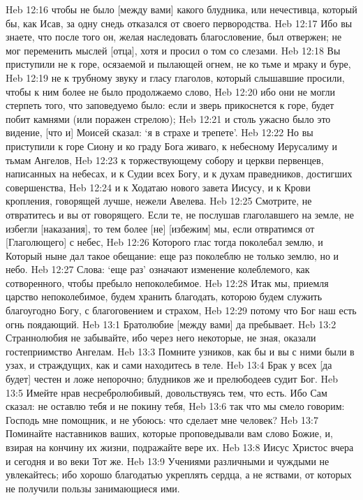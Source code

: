 Heb 12:16  чтобы не было [между вами] какого блудника, или нечестивца, который бы, как Исав, за одну снедь отказался от своего первородства.
Heb 12:17  Ибо вы знаете, что после того он, желая наследовать благословение, был отвержен; не мог переменить мыслей [отца], хотя и просил о том со слезами.
Heb 12:18  Вы приступили не к горе, осязаемой и пылающей огнем, не ко тьме и мраку и буре,
Heb 12:19  не к трубному звуку и гласу глаголов, который слышавшие просили, чтобы к ним более не было продолжаемо слово,
Heb 12:20  ибо они не могли стерпеть того, что заповедуемо было: если и зверь прикоснется к горе, будет побит камнями (или поражен стрелою);
Heb 12:21  и столь ужасно было это видение, [что и] Моисей сказал: `я в страхе и трепете'.
Heb 12:22  Но вы приступили к горе Сиону и ко граду Бога живаго, к небесному Иерусалиму и тьмам Ангелов,
Heb 12:23  к торжествующему собору и церкви первенцев, написанных на небесах, и к Судии всех Богу, и к духам праведников, достигших совершенства,
Heb 12:24  и к Ходатаю нового завета Иисусу, и к Крови кропления, говорящей лучше, нежели Авелева.
Heb 12:25  Смотрите, не отвратитесь и вы от говорящего. Если те, не послушав глаголавшего на земле, не избегли [наказания], то тем более [не] [избежим] мы, если отвратимся от [Глаголющего] с небес,
Heb 12:26  Которого глас тогда поколебал землю, и Который ныне дал такое обещание: еще раз поколеблю не только землю, но и небо.
Heb 12:27  Слова: `еще раз' означают изменение колеблемого, как сотворенного, чтобы пребыло непоколебимое.
Heb 12:28  Итак мы, приемля царство непоколебимое, будем хранить благодать, которою будем служить благоугодно Богу, с благоговением и страхом,
Heb 12:29  потому что Бог наш есть огнь поядающий.
Heb 13:1  Братолюбие [между вами] да пребывает.
Heb 13:2  Страннолюбия не забывайте, ибо через него некоторые, не зная, оказали гостеприимство Ангелам.
Heb 13:3  Помните узников, как бы и вы с ними были в узах, и страждущих, как и сами находитесь в теле.
Heb 13:4  Брак у всех [да будет] честен и ложе непорочно; блудников же и прелюбодеев судит Бог.
Heb 13:5  Имейте нрав несребролюбивый, довольствуясь тем, что есть. Ибо Сам сказал: не оставлю тебя и не покину тебя,
Heb 13:6  так что мы смело говорим: Господь мне помощник, и не убоюсь: что сделает мне человек?
Heb 13:7  Поминайте наставников ваших, которые проповедывали вам слово Божие, и, взирая на кончину их жизни, подражайте вере их.
Heb 13:8  Иисус Христос вчера и сегодня и во веки Тот же.
Heb 13:9  Учениями различными и чуждыми не увлекайтесь; ибо хорошо благодатью укреплять сердца, а не яствами, от которых не получили пользы занимающиеся ими.
